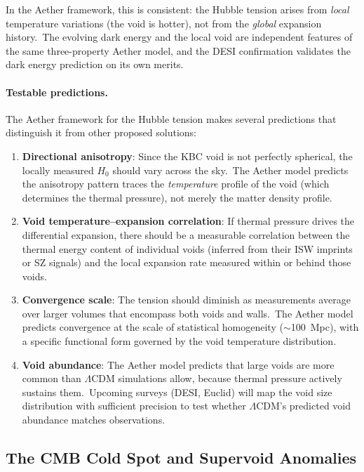 ﻿\documentclass[12pt,letterpaper]{article}
\begin{document}
In the Aether framework, this is consistent: the Hubble tension arises from
\emph{local} temperature variations (the void is hotter), not from the
\emph{global} expansion history.\ The evolving dark energy and the local void
are independent features of the same three-property Aether model, and the DESI
confirmation validates the dark energy prediction on its own merits.

\paragraph{Testable predictions.}
The Aether framework for the Hubble tension makes several predictions that
distinguish it from other proposed solutions:
%
\begin{enumerate}[leftmargin=2em]
  \item \textbf{Directional anisotropy}: Since the KBC void is not perfectly
    spherical, the locally measured $H_0$ should vary across the sky.\ The Aether
    model predicts the anisotropy pattern traces the \emph{temperature} profile
    of the void (which determines the thermal pressure), not merely the matter
    density profile.

  \item \textbf{Void temperature--expansion correlation}: If thermal pressure
    drives the differential expansion, there should be a measurable correlation
    between the thermal energy content of individual voids (inferred from their
    ISW imprints or SZ signals) and the local expansion rate measured within or
    behind those voids.

  \item \textbf{Convergence scale}: The tension should diminish as measurements
    average over larger volumes that encompass both voids and walls.\ The Aether
    model predicts convergence at the scale of statistical homogeneity
    ($\sim$100~Mpc), with a specific functional form governed by the void
    temperature distribution.

  \item \textbf{Void abundance}: The Aether model predicts that large voids are
    more common than $\Lambda$CDM simulations allow, because thermal pressure
    actively sustains them.\ Upcoming surveys (DESI, Euclid) will map the void
    size distribution with sufficient precision to test whether $\Lambda$CDM's
    predicted void abundance matches observations.
\end{enumerate}


\subsection{The CMB Cold Spot and Supervoid Anomalies}
\end{document}
